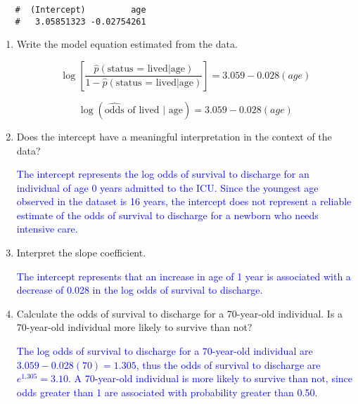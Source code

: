 \documentclass[letterpaper,12pt,twoside,]{pinp}
\begin{document}
\begin{enumerate}
\begin{Shaded}
\begin{Highlighting}[]
\SpecialCharTok{\textasciitilde{}} \NormalTok{(} \NormalTok{))}\SpecialCharTok{$}
\end{Highlighting}
\end{Shaded}

  \begin{ShadedResult}
   \begin{verbatim}
   #  (Intercept)         age 
   #   3.05851323 -0.02754261
   \end{verbatim}
   \end{ShadedResult}

  \begin{enumerate}
  \def\labelenumii{\alph{enumii})}
  \item
    Write the model equation estimated from the data.

    \color{blue}

    \[\log\left[\frac{\hat{p}( \text{status = lived} |\text{age})}{1 - \hat{p}(\text{status = lived} | \text{age})}\right] =  3.059 - 0.028(age) \]

    \[\log (\widehat{\text{odds}}\text{ of lived | age}) = 3.059 - 0.028(age) \]

    \color{black}
  \item
    Does the intercept have a meaningful interpretation in the context
    of the data?

    \textcolor{blue}{The intercept represents the log odds of survival to discharge for an individual of age 0 years admitted to the ICU. Since the youngest age observed in the dataset is 16 years, the intercept does not represent a reliable estimate of the odds of survival to discharge for a newborn who needs intensive care.}
  \item
    Interpret the slope coefficient.

    \textcolor{blue}{The intercept represents that an increase in age of 1 year is associated with a decrease of 0.028 in the log odds of survival to discharge.}
  \item
    Calculate the odds of survival to discharge for a 70-year-old
    individual. Is a 70-year-old individual more likely to survive than
    not?

    \textcolor{blue}{The log odds of survival to discharge for a 70-year-old individual are $3.059 - 0.028(70) = 1.305$, thus the odds of survival to discharge are $e^{1.305} = 3.10$. A 70-year-old individual is more likely to survive than not, since odds greater than 1 are associated with probability greater than 0.50.}
  \end{enumerate}


\end{enumerate}
\end{document}
